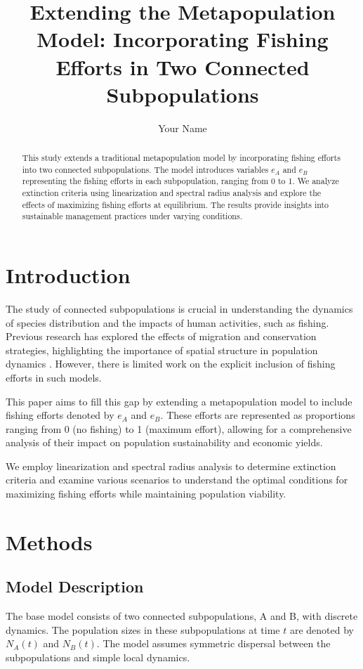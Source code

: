 \documentclass{article}
\title{Extending the Metapopulation Model: Incorporating Fishing Efforts in Two Connected Subpopulations}
\author{Your Name}
\date{}
\begin{document}
\maketitle

\begin{abstract}
This study extends a traditional metapopulation model by incorporating fishing efforts into two connected subpopulations. The model introduces variables $e_A$ and $e_B$ representing the fishing efforts in each subpopulation, ranging from 0 to 1. We analyze extinction criteria using linearization and spectral radius analysis and explore the effects of maximizing fishing efforts at equilibrium. The results provide insights into sustainable management practices under varying conditions.
\end{abstract}

\section{Introduction}

The study of connected subpopulations is crucial in understanding the dynamics of species distribution and the impacts of human activities, such as fishing. Previous research has explored the effects of migration and conservation strategies, highlighting the importance of spatial structure in population dynamics \cite{Franco2015}. However, there is limited work on the explicit inclusion of fishing efforts in such models.

This paper aims to fill this gap by extending a metapopulation model to include fishing efforts denoted by $e_A$ and $e_B$. These efforts are represented as proportions ranging from 0 (no fishing) to 1 (maximum effort), allowing for a comprehensive analysis of their impact on population sustainability and economic yields.

We employ linearization and spectral radius analysis to determine extinction criteria and examine various scenarios to understand the optimal conditions for maximizing fishing efforts while maintaining population viability.

\section{Methods}

\subsection{Model Description}
The base model consists of two connected subpopulations, A and B, with discrete dynamics. The population sizes in these subpopulations at time $t$ are denoted by $N_A(t)$ and $N_B(t)$. The model assumes symmetric dispersal between the subpopulations and simple local dynamics.
\end{document}
